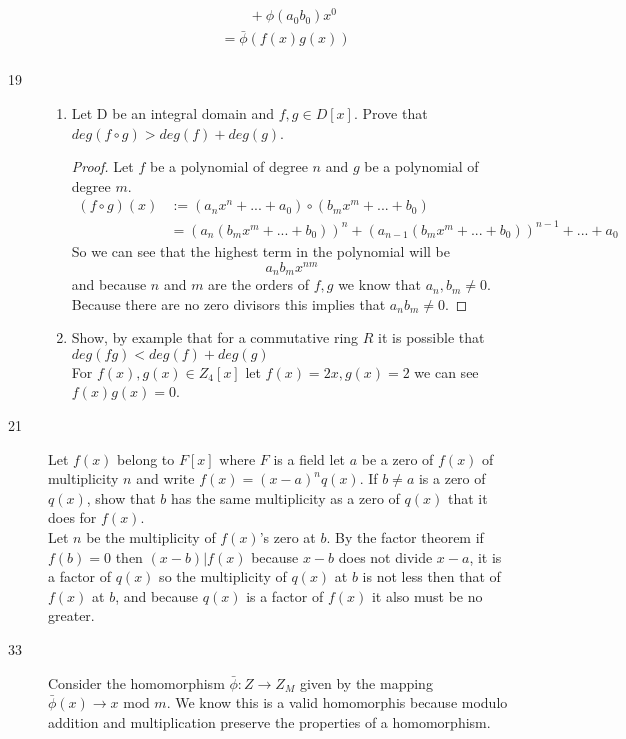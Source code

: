 \documentclass[11pt]{article}
\begin{document}
\begin{description}
\begin{align*}
			& \qquad + \phi(a_0b_0)x^0 \\
			& = \bar\phi(f(x)g(x)) \\
		\end{align*}
	\item[19]
		\begin{enumerate}
		\item Let D be an integral domain and $f, g \in D[x]$. Prove that
				$deg(f \circ g) > deg(f) + deg(g)$. 
		\begin{proof} Let $f$ be a polynomial of degree $n$ and $g$ be a polynomial of
		degree $m$.
		\begin{align*}
			(f \circ g)(x) 
			& := (a_nx^n + ... + a_0) \circ (b_{m}x^m + ... + b_0) \\
			& = (a_n(b_mx^m + ... + b_0))^n +(a_{n-1}(b_mx^m + ... +
			b_0))^{n-1} +   ... + a_0\
		\end{align*}
		So we can see that the highest term in the polynomial will be
			$$a_nb_mx^{nm}$$
			and because $n$ and $m$ are the orders of $f,g$ we
		know that $a_n,b_m \neq 0$. Because there are no zero
		divisors this implies that $a_nb_m \neq 0$.
		\end{proof}
		\item Show, by example that for a commutative ring $R$ it is
			possible that $deg(fg) < deg(f) + deg(g)$\\
			For $f(x), g(x) \in Z_4[x]$ let $f(x) = 2x, g(x) = 2$
			we can see $f(x)g(x) = 0$.
		\end{enumerate}
	\item[21] Let $f(x)$ belong to $F[x]$ where $F$ is a field let $a$ be a
		zero of $f(x)$ of multiplicity $n$ and write $f(x) = (x-a)^nq(x)$.
		If $b \neq a$ is a zero of $q(x)$, show that
		$b$ has the same multiplicity as a zero of $q(x)$ that it does for
		$f(x)$. \\
		Let $n$ be the multiplicity of $f(x)$'s zero at $b$. 
		By the factor theorem if $ f(b) = 0 $ then $ (x-b) | f(x) $
		because $x-b$ does not divide $x-a$, it is a factor of
		$q(x)$ so the multiplicity of $q(x)$ at $b$ is not less then
		that of $f(x)$ at $b$, and because $q(x)$ is a factor of $f(x)$ it 
		also must be no greater.



	\item[33]
		Consider the homomorphism $\bar\phi: Z \rightarrow Z_M $ given
		by the mapping $ \bar\phi(x) \rightarrow x \text{ mod } m $. We
		know this is a valid homomorphis because modulo addition and 
		multiplication preserve the properties of a homomorphism.


\end{description}
\end{document}
